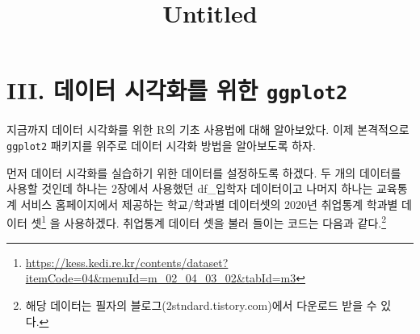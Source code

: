 \documentclass[
]{article}
\title{Untitled}
\author{}
\date{\vspace{-2.5em}}
\begin{document}
\maketitle

{
\setcounter{tocdepth}{2}
\tableofcontents
}
\hypertarget{iii.-uxb370uxc774uxd130-uxc2dcuxac01uxd654uxb97c-uxc704uxd55c-ggplot2}{%
\section{\texorpdfstring{III. 데이터 시각화를 위한 \texttt{ggplot2}}{III. 데이터 시각화를 위한 ggplot2}}\label{iii.-uxb370uxc774uxd130-uxc2dcuxac01uxd654uxb97c-uxc704uxd55c-ggplot2}}

지금까지 데이터 시각화를 위한 R의 기초 사용법에 대해 알아보았다. 이제 본격적으로 \texttt{ggplot2} 패키지를 위주로 데이터 시각화 방법을 알아보도록 하자.

먼저 데이터 시각화를 실습하기 위한 데이터를 설정하도록 하겠다. 두 개의 데이터를 사용할 것인데 하나는 2장에서 사용했던 df\_입학자 데이터이고 나머지 하나는 교육통계 서비스 홈페이지에서 제공하는 학교/학과별 데이터셋의 2020년 취업통계 학과별 데이터 셋\footnote{\url{https://kess.kedi.re.kr/contents/dataset?itemCode=04\&menuId=m_02_04_03_02\&tabId=m3}} 을 사용하겠다. 취업통계 데이터 셋을 불러 들이는 코드는 다음과 같다.\footnote{해당 데이터는 필자의 블로그(2stndard.tistory.com)에서 다운로드 받을 수 있다.}
\end{document}
